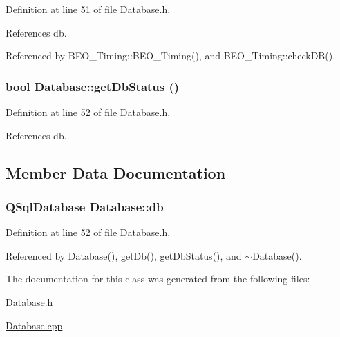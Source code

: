 Definition at line 51 of file Database.h.

References db.

Referenced by BEO\_\-Timing::BEO\_\-Timing(), and BEO\_\-Timing::checkDB().\hypertarget{class_database_2ba851b65f3382496d35cd70de21bfff}{
\subsubsection[getDbStatus]{\setlength{\rightskip}{0pt plus 5cm}bool Database::getDbStatus ()}}
\label{class_database_2ba851b65f3382496d35cd70de21bfff}




Definition at line 52 of file Database.h.

References db.

\subsection{Member Data Documentation}
\hypertarget{class_database_ea64d7d99483faec8f049cdd817bb693}{
\subsubsection[db]{\setlength{\rightskip}{0pt plus 5cm}QSqlDatabase {\bf Database::db}}}
\label{class_database_ea64d7d99483faec8f049cdd817bb693}




Definition at line 52 of file Database.h.

Referenced by Database(), getDb(), getDbStatus(), and $\sim$Database().

The documentation for this class was generated from the following files:\begin{CompactItemize}
\item 
\hyperlink{_database_8h}{Database.h}\item 
\hyperlink{_database_8cpp}{Database.cpp}\end{CompactItemize}

